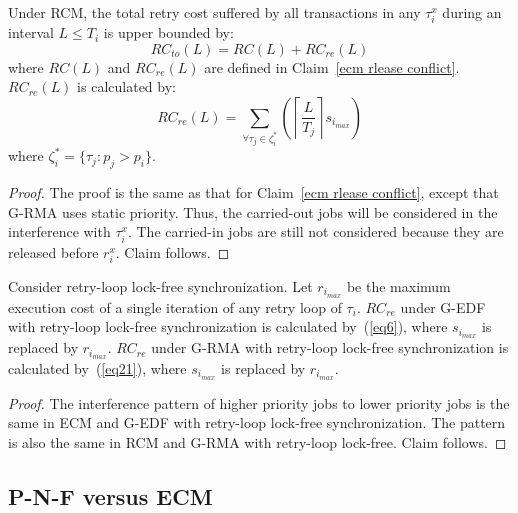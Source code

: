 \begin{clm}\label{rcm rlease conflict}
Under RCM, the total retry cost suffered by all transactions in any $\tau_i^x$ during an interval $L\le T_i$ is upper bounded by:
\begin{equation}
RC_{to}(L)=RC(L)+RC_{re}(L)
\label{total rc rcm eq}
\end{equation}
%
where $RC(L)$ and $RC_{re}(L)$ are defined in Claim~\ref{ecm rlease conflict}. $RC_{re}(L)$ is calculated by:
\begin{equation}
RC_{re}(L)=\sum_{\forall \tau_j \in \zeta_i^*}\left(\left\lceil\frac{L}{T_j}\right\rceil s_{i_{max}}\right)\label{eq21}
\end{equation}
%
where $\zeta_i^*=\{\tau_j:p_j > p_i \}$.
\end{clm}
\begin{proof}
The proof is the same as that for Claim~\ref{ecm rlease conflict}, except that G-RMA uses static priority. Thus, the carried-out jobs will be considered in the  interference with $\tau_i^x$. The carried-in jobs are still not considered because they are released before $r_i^x$. Claim follows.
\end{proof}
\begin{clm}\label{lock free release}
Consider retry-loop lock-free synchronization. Let $r_{i_{max}}$ be the maximum execution cost of a single iteration of any retry loop of $\tau_i$. $RC_{re}$ under G-EDF  with retry-loop lock-free synchronization is calculated by~(\ref{eq6}), where $s_{i_{max}}$ is replaced by $r_{i_{max}}$. $RC_{re}$ under G-RMA with retry-loop lock-free synchronization is calculated by~(\ref{eq21}), where $s_{i_{max}}$ is replaced by $r_{i_{max}}$.
\end{clm}
%
\begin{proof}
The interference pattern of higher priority jobs to lower priority jobs is the same in ECM and G-EDF with retry-loop lock-free synchronization. The pattern is also the same in RCM and G-RMA with retry-loop lock-free. Claim follows.
\end{proof}


\subsection{P-N-F versus ECM\label{pnf vs ecm sec}}

